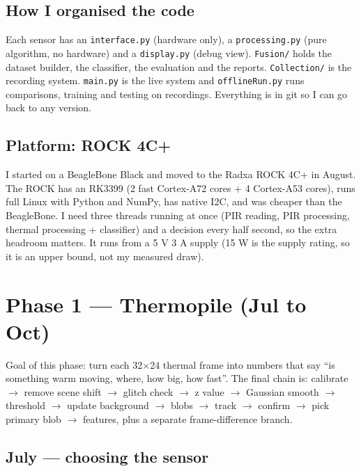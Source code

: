 \documentclass[11pt,a4paper]{article}
\begin{document}
\hypertarget{how-i-organised-the-code}{%
\subsection{How I organised
the
code}\label{how-i-organised-the-code}}

Each sensor has an
\texttt{interface.py}
(hardware only), a
\texttt{processing.py} (pure
algorithm, no hardware) and a
\texttt{display.py} (debug
view). \texttt{Fusion/} holds
the dataset builder, the
classifier, the evaluation and
the reports.
\texttt{Collection/} is the
recording system.
\texttt{main.py} is the live
system and
\texttt{offlineRun.py} runs
comparisons, training and
testing on recordings.
Everything is in git so I can
go back to any version.

\hypertarget{platform-rock-4c}{%
\subsection{Platform: ROCK
4C+}\label{platform-rock-4c}}

I started on a BeagleBone
Black and moved to the Radxa
ROCK 4C+ in August. The ROCK
has an RK3399 (2 fast
Cortex-A72 cores + 4
Cortex-A53 cores), runs full
Linux with Python and NumPy,
has native I2C, and was
cheaper than the BeagleBone. I
need three threads running at
once (PIR reading, PIR
processing, thermal processing
+ classifier) and a decision
every half second, so the
extra headroom matters. It
runs from a 5 V 3 A supply (15
W is the supply rating, so it
is an upper bound, not my
measured draw).

\hypertarget{phase-1-thermopile-jul-to-oct}{%
\section{Phase 1 ---
Thermopile (Jul to
Oct)}\label{phase-1-thermopile-jul-to-oct}}

Goal of this phase: turn each
32$\times$24 thermal frame into
numbers that say ``is
something warm moving, where,
how big, how fast''. The final
chain is: calibrate $\rightarrow$ remove
scene shift $\rightarrow$ glitch check $\rightarrow$ z
value $\rightarrow$ Gaussian smooth $\rightarrow$
threshold $\rightarrow$ update background
$\rightarrow$ blobs $\rightarrow$ track $\rightarrow$ confirm $\rightarrow$
pick primary blob $\rightarrow$ features,
plus a separate
frame-difference branch.

\hypertarget{july-choosing-the-sensor}{%
\subsection{July --- choosing
the
sensor}\label{july-choosing-the-sensor}}
\end{document}
